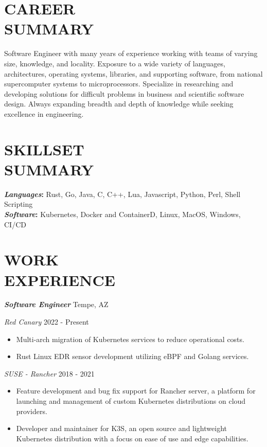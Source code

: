 \documentclass[line,margin]{res}
\renewcommand{\headrulewidth}{0pt} %
\begin{document}
\thispagestyle{empty}


\renewcommand{\headrulewidth}{0pt}

\begin{resume}

  \section{CAREER\\SUMMARY}
  Software Engineer with many years of experience working with teams of varying size, knowledge, and locality.
  Exposure to a wide variety of languages, architectures, operating systems, libraries, and supporting
  software, from national supercomputer systems to microprocessors. Specialize in researching and developing
  solutions for difficult problems in business and scientific software design. Always expanding breadth and
  depth of knowledge while seeking excellence in engineering.

  \section{SKILLSET\\SUMMARY}
          {\bf \emph{Languages}:} Rust, Go, Java, C, C++, Lua, Javascript, Python, Perl, Shell Scripting \\
          {\bf \emph{Software}:} Kubernetes, Docker and ContainerD, Linux, MacOS, Windows, CI/CD

  \section{WORK\\EXPERIENCE}
          {\bf \emph{Software Engineer}} \hfill Tempe, AZ

          {\sl Red Canary} \hfill 2022 - Present
          \begin{itemize} \itemsep -2pt
          \item
            Multi-arch  migration of Kubernetes services to reduce operational costs.
          \item
            Rust Linux EDR sensor development utilizing eBPF and Golang services.
          \end{itemize}

          {\sl SUSE - Rancher} \hfill 2018 - 2021
          \begin{itemize} \itemsep -2pt
          \item
            Feature development and bug fix support for Rancher server, a platform for launching and management of custom Kubernetes distributions on cloud providers.
          \item
            Developer and maintainer for K3S, an open source and lightweight Kubernetes distribution with a focus on ease of use and edge capabilities.
          \end{itemize}


\end{resume}
\end{document}
